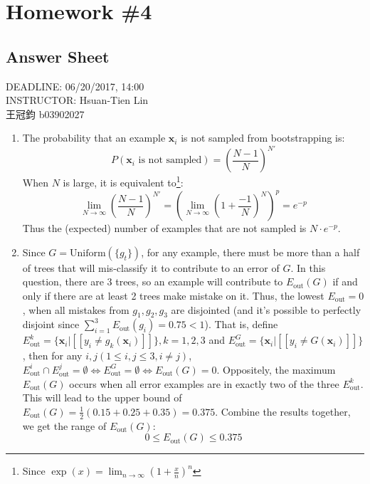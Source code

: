 \documentclass[11pt]{article}
\begin{document}
\section*{Homework \#4}
\subsection*{Answer Sheet}
\begin{center}
DEADLINE: 06/20/2017, 14:00\\
INSTRUCTOR:  Hsuan-Tien Lin\\[0.5cm]
王冠鈞 b03902027
\end{center}


\begin{enumerate}[label=\textbf{\arabic*}.]
	\item The probability that an example $\mathbf{x}_i$ is not sampled from bootstrapping is: 
  \[P(\mathbf{x}_i \text{ is not sampled}) = \left(\frac{N-1}{N}\right)^{N'}\]
      When $N$ is large, it is equivalent to\footnote{Since $\exp(x) = \lim_{n\rightarrow \infty} \left(1+\frac{x}{n}\right)^n$}:
      \[\lim_{N \rightarrow \infty} \left(\frac{N-1}{N}\right)^{N'} = \left(\lim_{N \rightarrow \infty} \left(1 + \frac{-1}{N}\right)^{N}\right)^p = e^{-p}\]
      Thus the (expected) number of examples that are not sampled is $N\cdot e^{-p}$.

  \item Since $G = \text{Uniform}(\{g_t\})$, for any example, there must be more than a half of trees that will mis-classify it to contribute to an error of $G$. In this question, there are 3 trees, so an example will contribute to $E_\text{out}(G)$ if and only if there are at least 2 trees make mistake on it. Thus, the lowest $E_\text{out} = 0$, when all mistakes from $g_1, g_2, g_3$ are disjointed (and it's possible to perfectly disjoint since $\sum_{i=1}^3 E_\text{out}(g_i) = 0.75 < 1$). That is, define $E_\text{out}^k = \{\textbf{x}_i | [\![ y_i \neq g_k(\textbf{x}_i)  ]\!] \}, k = 1, 2, 3$ and $E_\text{out}^G = \{\textbf{x}_i | [\![ y_i \neq G(\textbf{x}_i)  ]\!] \}$, then for any $i, j (1\leq i, j \leq 3, i \neq j)$, $E_\text{out}^i \cap E_\text{out}^j = \emptyset \Leftrightarrow E_\text{out}^G = \emptyset \Leftrightarrow E_\text{out}(G) = 0$. Oppositely, the maximum $E_\text{out}(G)$ occurs when all error examples are in exactly two of the three $E_\text{out}^k$. This will lead to the upper bound of $E_\text{out}(G) = \frac{1}{2}(0.15+0.25+0.35) = 0.375$. Combine the results together, we get the range of $E_\text{out}(G)$:
  \[0 \leq E_\text{out}(G) \leq 0.375 \]


\end{enumerate}
\end{document}
